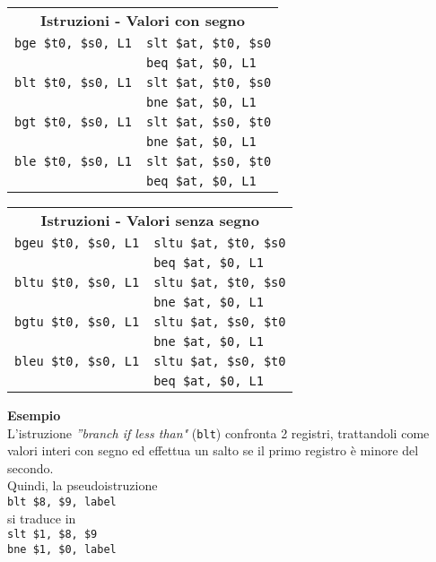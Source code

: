 \documentclass[../main.tex]{subfiles}
\begin{document}
\begin{table}[h!]
    \begin{minipage}{.5\linewidth}
        \begin{tabular}{ l l }
            \multicolumn{2}{c}{\textbf{Istruzioni - Valori con segno}} \\
            \texttt{bge \$t0, \$s0, L1} & \texttt{slt \$at, \$t0, \$s0} \\
            & \texttt{beq \$at, \$0, L1} \\
            \texttt{blt \$t0, \$s0, L1} & \texttt{slt \$at, \$t0, \$s0} \\
            & \texttt{bne \$at, \$0, L1} \\
            \texttt{bgt \$t0, \$s0, L1} & \texttt{slt \$at, \$s0, \$t0} \\
            & \texttt{bne \$at, \$0, L1} \\
            \texttt{ble \$t0, \$s0, L1} & \texttt{slt \$at, \$s0, \$t0} \\
            & \texttt{beq \$at, \$0, L1} \\
        \end{tabular}
    \end{minipage}
    \begin{minipage}{.5\linewidth}
        \begin{tabular}{ l l }
            \multicolumn{2}{c}{\textbf{Istruzioni - Valori senza segno}} \\
            \texttt{bgeu \$t0, \$s0, L1} & \texttt{sltu \$at, \$t0, \$s0} \\
            & \texttt{beq \$at, \$0, L1} \\
            \texttt{bltu \$t0, \$s0, L1} & \texttt{sltu \$at, \$t0, \$s0} \\
            & \texttt{bne \$at, \$0, L1} \\
            \texttt{bgtu \$t0, \$s0, L1} & \texttt{sltu \$at, \$s0, \$t0} \\
            & \texttt{bne \$at, \$0, L1} \\
            \texttt{bleu \$t0, \$s0, L1} & \texttt{sltu \$at, \$s0, \$t0} \\
            & \texttt{beq \$at, \$0, L1} \\
        \end{tabular}
    \end{minipage}
\end{table}

\noindent
\textbf{Esempio} \\
L'istruzione \textit{''branch if less than"} (\texttt{blt})
confronta 2 registri, trattandoli come valori interi con segno
ed effettua un salto se il primo registro è minore del secondo. \\
Quindi, la pseudoistruzione \\
\texttt{\hspace*{5mm}blt \$8, \$9, label} \\
si traduce in \\
\texttt{\hspace*{5mm}slt \$1, \$8, \$9} \\
\texttt{\hspace*{5mm}bne \$1, \$0, label}

\newpage
\end{document}

